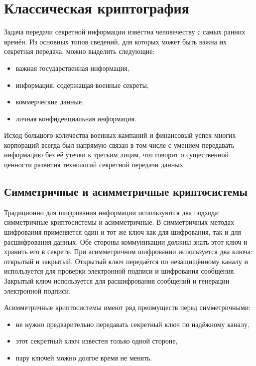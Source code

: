 
\section{Классическая криптография}
Задача передачи секретной информации известна человечеству с самых ранних времён. Из основных типов сведений, для которых может быть важна их
секретная передача, можно выделить следующие:
\begin{itemize}
  \item важная государственная информация,
  \item информация, содержащая военные секреты,
  \item коммерческие данные,
  \item личная конфиденциальная информация.
\end{itemize}

Исход большого количества военных кампаний и финансовый успех многих корпораций всегда был напрямую связан в том числе с умением передавать
информацию без её утечки к третьим лицам, что говорит о существенной ценности развития технологий секретной передачи данных.

\subsection{Симметричные и асимметричные криптосистемы}
Традиционно для шифрования информации используются два подхода: симметричные криптосистемы и асимметричные.
В симметричных методах шифрования применяется один и тот же ключ как для шифрования, так и для расшифрования данных. Обе стороны коммуникации должны знать этот ключ и хранить его в секрете.
При асимметричном шифровании используется два ключа: открытый и закрытый. Открытый ключ передаётся по незащищённому каналу и используется для проверки электронной подписи и шифрования сообщения.
Закрытый ключ используется для расшифрования сообщений и генерации электронной подписи. 

Асимметричные криптосистемы имеют ряд преимуществ перед симметричными: 
\begin{itemize}
  \item не нужно предварительно передавать секретный ключ по надёжному каналу,
  \item этот секретный ключ известен только одной стороне, 
  \item пару ключей можно долгое время не менять.
\end{itemize}

